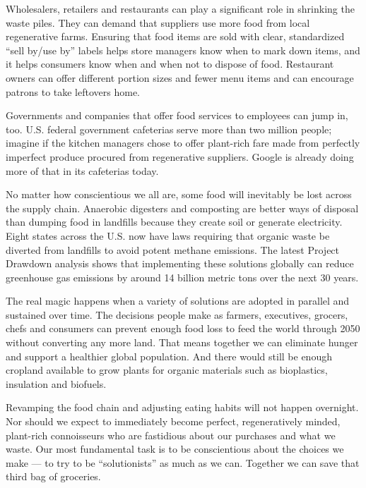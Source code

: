 \documentclass[a4paper]{article}
\begin{document}
Wholesalers, retailers and restaurants can play a significant role in shrinking the waste piles. They can demand that suppliers use more food from local regenerative farms. Ensuring that food items are sold with clear, standardized “sell by/use by” labels helps store managers know when to mark down items, and it helps consumers know when and when not to dispose of food. Restaurant owners can offer different portion sizes and fewer menu items and can encourage patrons to take leftovers home.

Governments and companies that offer food services to employees can jump in, too. U.S. federal government cafeterias serve more than two million people; imagine if the kitchen managers chose to offer plant-rich fare made from perfectly imperfect produce procured from regenerative suppliers. Google is already doing more of that in its cafeterias today.

No matter how conscientious we all are, some food will inevitably be lost across the supply chain. Anaerobic digesters and composting are better ways of disposal than dumping food in landfills because they create soil or generate electricity. Eight states across the U.S. now have laws requiring that organic waste be diverted from landfills to avoid potent methane emissions. The latest Project Drawdown analysis shows that implementing these solutions globally can reduce greenhouse gas emissions by around 14 billion metric tons over the next 30 years.

The real magic happens when a variety of solutions are adopted in parallel and sustained over time. The decisions people make as farmers, executives, grocers, chefs and consumers can prevent enough food loss to feed the world through 2050 without converting any more land. That means together we can eliminate hunger and support a healthier global population. And there would still be enough cropland available to grow plants for organic materials such as bioplastics, insulation and biofuels.

Revamping the food chain and adjusting eating habits will not happen overnight. Nor should we expect to immediately become perfect, regeneratively minded, plant-rich connoisseurs who are fastidious about our purchases and what we waste. Our most fundamental task is to be conscientious about the choices we make --- to try to be “solutionists” as much as we can. Together we can save that third bag of groceries.
\end{document}
